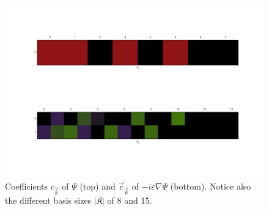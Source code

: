 \begin{figure}
  \centering
  \includegraphics[width=0.8\linewidth]{./fig/wavepacket_coefficients.pdf}
  \caption[Coefficients of the gradient example]
         {Coefficients $c_{\vec{k}}$ of $\Psi$ (top) and $\vec{c}_{\vec{k}}$ of
          $-i \varepsilon \nabla \Psi$ (bottom). Notice also the different basis
          sizes $|\mathfrak{K}|$ of 8 and 15.}
  \label{fig:wavepacket_coefficients}
\end{figure}
